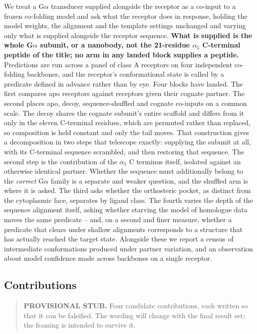 We treat a G$\alpha$ transducer supplied alongside the receptor as a co-input to a frozen co-folding
model and ask what the receptor does in response, holding the model weights, the alignment and the
template settings unchanged and varying only what is supplied alongside the receptor sequence.
\textbf{What is supplied is the whole G$\alpha$ subunit, or a nanobody, not the 21-residue
$\alpha_5$ C-terminal peptide of the title; no arm in any landed block supplies a peptide.}
Predictions are run across a panel of class A receptors on four independent co-folding backbones,
and the receptor's conformational state is called by a predicate defined in advance rather than by
eye. Four blocks have landed. The first compares apo receptors against receptors given their cognate
partner. The second places apo, decoy, sequence-shuffled and cognate co-inputs on a common scale. The decoy
shares the cognate subunit's entire scaffold and differs from it only in the eleven C-terminal
residues, which are permuted rather than replaced, so composition is held constant and only the tail
moves. That construction gives a decomposition in two steps that telescope exactly: supplying the
subunit at all, with its C-terminal sequence scrambled, and then restoring that sequence. The second
step is the contribution of the $\alpha_5$ C terminus itself, isolated against an otherwise
identical partner. Whether the sequence must additionally belong to the \emph{correct} G$\alpha$
family is a separate and weaker question, and the shuffled arm is where it is asked. The third asks whether the orthosteric pocket, as distinct
from the cytoplasmic face, separates by ligand class. The fourth varies the depth of the sequence
alignment itself, asking whether starving the model of homologue data moves the same predicate --
and, on a second and finer measure, whether a predicate that clears under shallow alignments
corresponds to a structure that has actually reached the target state. Alongside these we report a census of
intermediate conformations produced under partner variation, and an observation about model
confidence made across backbones on a single receptor.

\subsection{Contributions}

\begin{quote}
\textbf{PROVISIONAL STUB.} Four candidate contributions, each written so that it can be falsified.
The wording will change with the final result set; the framing is intended to survive it.
\end{quote}


